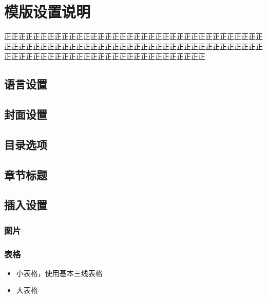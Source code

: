 
\chapter{模版设置说明}
正正正正正正正正正正正正正正正正正正正正正正正正正正正正正正正正正正正正正正正正正正正正正正正正正正正正正正正正正正正正正正正正正正正正正正正正正正正正正正正正正正正正正正正正正正正正正正正正正正正正
\section{语言设置}

\section{封面设置}

\section{目录选项}

\section{章节标题}

\section{插入设置}
\subsection{图片}
\subsection{表格}

\begin{itemize}
    \item 小表格，使用基本三线表格

    \item 大表格
\end{itemize}

